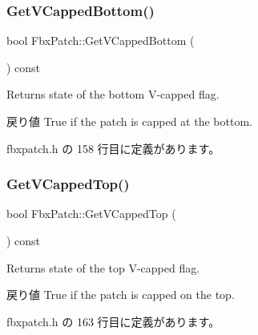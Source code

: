 \mbox{\label{class_fbx_patch_a57ded499bc9f25f46dd2b3acd44a23f7}} 
\subsubsection{\texorpdfstring{Get\+V\+Capped\+Bottom()}{GetVCappedBottom()}}
{\footnotesize\ttfamily bool Fbx\+Patch\+::\+Get\+V\+Capped\+Bottom (\begin{DoxyParamCaption}{ }\end{DoxyParamCaption}) const\hspace{0.3cm}{\ttfamily [inline]}}

Returns state of the bottom V-\/capped flag. \begin{DoxyReturn}{戻り値}
{\ttfamily True} if the patch is capped at the bottom. 
\end{DoxyReturn}


 fbxpatch.\+h の 158 行目に定義があります。

\mbox{\label{class_fbx_patch_a55ab377367fd1592ef5111a85e0f7a48}} 
\subsubsection{\texorpdfstring{Get\+V\+Capped\+Top()}{GetVCappedTop()}}
{\footnotesize\ttfamily bool Fbx\+Patch\+::\+Get\+V\+Capped\+Top (\begin{DoxyParamCaption}{ }\end{DoxyParamCaption}) const\hspace{0.3cm}{\ttfamily [inline]}}

Returns state of the top V-\/capped flag. \begin{DoxyReturn}{戻り値}
{\ttfamily True} if the patch is capped on the top. 
\end{DoxyReturn}


 fbxpatch.\+h の 163 行目に定義があります。

\mbox{\label{class_fbx_patch_aea85ef627c9d56153e85ad0007101f72}} 
